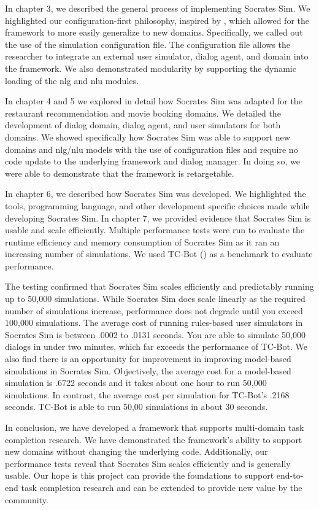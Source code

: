 In chapter 3, we described the general process of implementing Socrates Sim. We highlighted our configuration-first philosophy, inspired by \cite{Gardner_allennlp}, which allowed for the framework to more easily generalize to new domains. Specifically, we called out the use of the simulation configuration file. The configuration file allows the researcher to integrate an external user simulator, dialog agent, and domain into the framework. We also demonstrated modularity by supporting the dynamic loading of the nlg and nlu modules.

In chapter 4 and 5 we explored in detail how Socrates Sim was adapted for the restaurant recommendation and movie booking domains. We detailed the development of dialog domain, dialog agent, and user simulators for both domains. We showed specifically how Socrates Sim was able to support new domains and nlg/nlu models with the use of configuration files and require no code update to the underlying framework and dialog manager. In doing so, we were able to demonstrate that the framework is retargetable. 
  
In chapter 6, we described how Socrates Sim was developed. We highlighted the tools, programming language, and other development specific choices made while developing Socrates Sim. In chapter 7, we provided evidence that Socrates Sim is usable and scale efficiently. Multiple performance tests were run to evaluate the runtime efficiency and memory consumption of Socrates Sim as it ran an increasing number of simulations. We used TC-Bot (\cite{li_end_to_end}) as a benchmark to evaluate performance. 

The testing confirmed that Socrates Sim scales efficiently and predictably running up to 50,000 simulations. While Socrates Sim does scale linearly as the required number of simulations increase, performance does not degrade until you exceed 100,000 simulations. The average cost of running rules-based user simulators in Socrates Sim is between .0002 to .0131 seconds. You are able to simulate 50,000 dialogs in under two minutes, which far exceeds the performance of TC-Bot. We also find there is an opportunity for improvement in improving model-based simulations in Socrates Sim. Objectively, the average cost for a model-based simulation is .6722 seconds and it takes about one hour to run 50,000 simulations. In contrast, the average cost per simulation for TC-Bot's .2168 seconds. TC-Bot is able to run 50,00 simulations in about 30 seconds. 
 
In conclusion, we have developed a framework that supports multi-domain task completion research. We have demonstrated the framework's ability to support new domains without changing the underlying code. Additionally, our performance tests reveal that Socrates Sim scales efficiently and is generally usable. Our hope is this project can provide the foundations to support end-to-end task completion research and can be extended to provide new value by the community.

